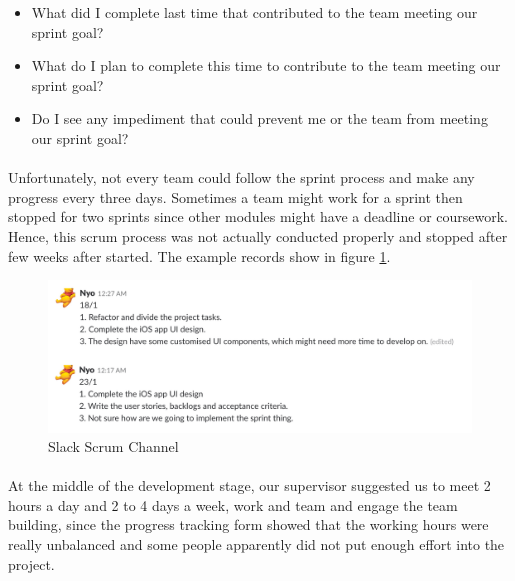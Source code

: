 \documentclass[12pt,a4paper]{article}
\begin{document}
          \begin{itemize}
            \item What did I complete last time that contributed to the team meeting our sprint goal?
            \item What do I plan to complete this time to contribute to the team meeting our sprint goal?
            \item Do I see any impediment that could prevent me or the team from meeting our sprint goal?
          \end{itemize}    

          \paragraph{}Unfortunately, not every team could follow the sprint process and make any progress every three days. Sometimes a team might work for a sprint then stopped for two sprints since other modules might have a deadline or coursework. Hence, this scrum process was not actually conducted properly and stopped after few weeks after started. The example records show in figure \ref{fig:Slack Scrum Channel}. 

          \begin{figure}[H]
            \centering
            \includegraphics[width=1\textwidth]{../assets/development-records-slack-scrum-channel.png}
            \caption{Slack Scrum Channel}
            \label{fig:Slack Scrum Channel}
          \end{figure}
          
          \paragraph{}At the middle of the development stage, our supervisor suggested us to meet 2 hours a day and 2 to 4 days a week, work and team and engage the team building, since the progress tracking form showed that the working hours were really unbalanced and some people apparently did not put enough effort into the project. 
          
\end{document}

